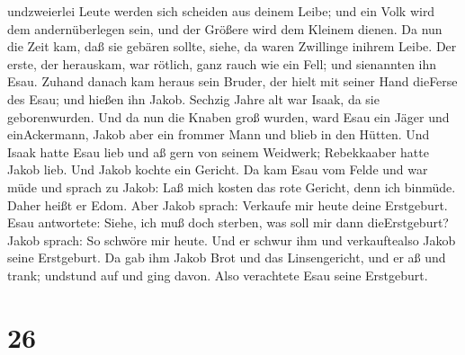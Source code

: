 undzweierlei Leute werden sich scheiden aus deinem Leibe; und ein Volk
wird dem andernüberlegen sein, und der Größere wird dem Kleinem dienen.
 Da nun die Zeit kam, daß sie gebären sollte, siehe, da
waren Zwillinge inihrem Leibe.  Der erste, der herauskam,
war rötlich, ganz rauch wie ein Fell; und sienannten ihn Esau.
 Zuhand danach kam heraus sein Bruder, der hielt mit seiner
Hand dieFerse des Esau; und hießen ihn Jakob. Sechzig Jahre alt war
Isaak, da sie geborenwurden.  Und da nun die Knaben groß
wurden, ward Esau ein Jäger und einAckermann, Jakob aber ein frommer
Mann und blieb in den Hütten.  Und Isaak hatte Esau lieb
und aß gern von seinem Weidwerk; Rebekkaaber hatte Jakob lieb.
 Und Jakob kochte ein Gericht. Da kam Esau vom Felde und
war müde  und sprach zu Jakob: Laß mich kosten das rote
Gericht, denn ich binmüde. Daher heißt er Edom.  Aber Jakob
sprach: Verkaufe mir heute deine Erstgeburt.  Esau
antwortete: Siehe, ich muß doch sterben, was soll mir dann
dieErstgeburt?  Jakob sprach: So schwöre mir heute. Und er
schwur ihm und verkauftealso Jakob seine Erstgeburt.  Da
gab ihm Jakob Brot und das Linsengericht, und er aß und trank; undstund
auf und ging davon. Also verachtete Esau seine Erstgeburt.

\hypertarget{section-25}{%
\section{26}\label{section-25}}

